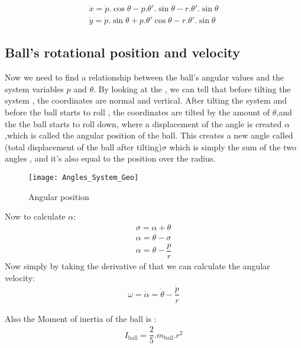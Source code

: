 \begin{equation}
	\begin{split}
		\dot{x}  = \dot{p}.\cos{\theta}-p.\theta'.\sin{\theta} - r.\theta'.\sin{\theta} \\
		\dot{y}  = \dot{p}.\sin{\theta}+ p.\theta'\cos{\theta} - r.\theta'.\sin{\theta} 
	\end{split}
\end{equation}
\newpage
\subsection{Ball's rotational position and velocity}
Now we need to find a relationship between the ball's angular values and the system variables $p$ and $\theta$.
By looking at the  , we can tell that before tilting the system , the coordinates are normal and vertical.
After tilting the system and before the ball starts to roll , the coordinates are tilted by the amount of $\theta$,and the the ball starts to roll down, where 
a displacement of the angle is created $\alpha$,which is called the angular position of the ball.
This creates a new angle called (total displacement of the ball after tilting)$\sigma$ which is simply the sum of the two angles , and it's also equal to the position over the radius.

\begin{figure}[h]
	\centering
	\texttt{[image: Angles\_System\_Geo]}
	\caption{Angular position}\label{Angles_System_Geo}
\end{figure}
Now to calculate $\alpha$:
\begin{equation}
	\begin{split}
		\sigma = \alpha + \theta \\
		\alpha = \theta - \sigma \\
		\alpha = \theta - \dfrac{p}{r}		
	\end{split}
\end{equation}
Now simply by taking the derivative of that we can calculate the angular velocity:
\begin{equation}
	\begin{split}
		\omega = \dot{\alpha} = \dot{\theta} - \dfrac{\dot{p}}{r}
	\end{split}
\end{equation}

Also the Moment of inertia of the ball is : 
\begin{equation}
	\begin{split}
		I_{\text{ball}} = \dfrac{2}{5}.m_{\text{ball}}.r^2
	\end{split}
\end{equation}
\newpage
